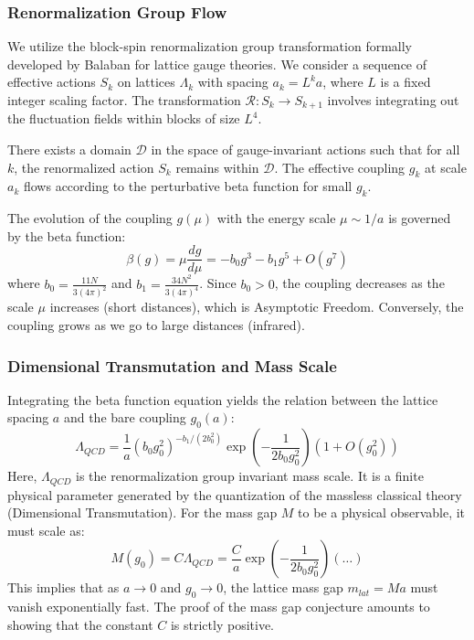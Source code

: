 \subsubsection{Renormalization Group Flow}
We utilize the block-spin renormalization group transformation formally developed by Balaban for lattice gauge theories. We consider a sequence of effective actions $S_k$ on lattices $\Lambda_k$ with spacing $a_k = L^k a$, where $L$ is a fixed integer scaling factor.
The transformation $\mathcal{R}: S_k \to S_{k+1}$ involves integrating out the fluctuation fields within blocks of size $L^4$.

\begin{lemma}
There exists a domain $\mathcal{D}$ in the space of gauge-invariant actions such that for all $k$, the renormalized action $S_k$ remains within $\mathcal{D}$. The effective coupling $g_k$ at scale $a_k$ flows according to the perturbative beta function for small $g_k$.
\end{lemma}

The evolution of the coupling $g(\mu)$ with the energy scale $\mu \sim 1/a$ is governed by the beta function:
\begin{equation}
\beta(g) = \mu \frac{dg}{d\mu} = -b_0 g^3 - b_1 g^5 + O(g^7)
\end{equation}
where $b_0 = \frac{11N}{3(4\pi)^2}$ and $b_1 = \frac{34N^2}{3(4\pi)^4}$. Since $b_0 > 0$, the coupling decreases as the scale $\mu$ increases (short distances), which is Asymptotic Freedom. Conversely, the coupling grows as we go to large distances (infrared).

\subsubsection{Dimensional Transmutation and Mass Scale}
Integrating the beta function equation yields the relation between the lattice spacing $a$ and the bare coupling $g_0(a)$:
\begin{equation}
\Lambda_{QCD} = \frac{1}{a} (b_0 g_0^2)^{-b_1/(2b_0^2)} \exp\left( -\frac{1}{2b_0 g_0^2} \right) \left( 1 + O(g_0^2) \right)
\end{equation}
Here, $\Lambda_{QCD}$ is the renormalization group invariant mass scale. It is a finite physical parameter generated by the quantization of the massless classical theory (Dimensional Transmutation).
For the mass gap $M$ to be a physical observable, it must scale as:
\begin{equation}
M(g_0) = C \Lambda_{QCD} = \frac{C}{a} \exp\left( -\frac{1}{2b_0 g_0^2} \right) (\dots)
\end{equation}
This implies that as $a \to 0$ and $g_0 \to 0$, the lattice mass gap $m_{lat} = M a$ must vanish exponentially fast. The proof of the mass gap conjecture amounts to showing that the constant $C$ is strictly positive.

